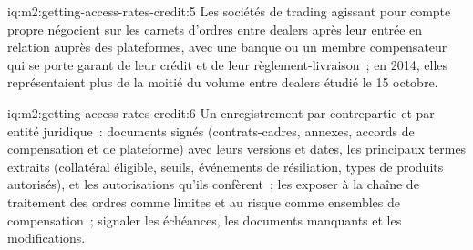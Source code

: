 \begin{solution}{iq:m2:getting-access-rates-credit:5}
Les sociétés de trading agissant pour compte propre négocient sur les carnets d'ordres entre dealers après
leur entrée en relation auprès des plateformes, avec une banque ou un membre compensateur qui se porte garant de leur crédit et
de leur règlement-livraison~; en 2014, elles représentaient plus de la moitié du volume entre dealers étudié le 15
octobre.
\end{solution}

\begin{solution}{iq:m2:getting-access-rates-credit:6}
Un enregistrement par contrepartie et par entité juridique~: documents signés (contrats-cadres,
annexes, accords de compensation et de plateforme) avec leurs versions et dates, les principaux
termes extraits (collatéral éligible, seuils, événements de résiliation, types de
produits autorisés), et les autorisations qu'ils confèrent~; les exposer à la chaîne de traitement des ordres comme limites et
au risque comme ensembles de compensation~; signaler les échéances, les documents manquants et les modifications.
\end{solution}
